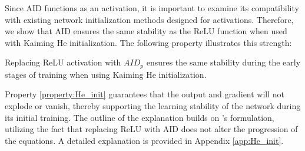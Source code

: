 Since AID functions as an activation, it is important to examine its compatibility with existing network initialization methods designed for activations.
Therefore, we show that AID ensures the same stability as the ReLU function when used with Kaiming He initialization.
The following property illustrates this strength:

\begin{property}
    \label{property:He_init}
    Replacing ReLU activation with $AID_p$ ensures the same stability during the early stages of training when using Kaiming He initialization.
\end{property}

Property \ref{property:He_init} guarantees that the output and gradient will not explode or vanish, thereby supporting the learning stability of the network during its initial training.
The outline of the explanation builds on \citet{he2015delving}’s formulation, utilizing the fact that replacing ReLU with AID does not alter the progression of the equations.
A detailed explanation is provided in Appendix \ref{app:He_init}.

